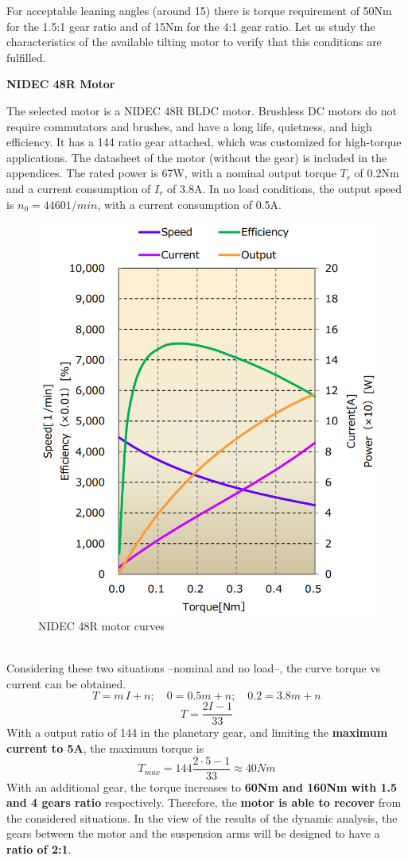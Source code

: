 For acceptable leaning angles (around 15\degree) there is torque requirement of 50Nm for the 1.5:1 gear ratio and of 15Nm for the 4:1 gear ratio. Let us study the characteristics of the available tilting motor to verify that this conditions are fulfilled.   

\newpage
\textbf{NIDEC 48R Motor}

The selected motor is a NIDEC 48R BLDC motor. Brushless DC motors do not require commutators and brushes, and have a long life, quietness, and high efficiency. It has a 144 ratio gear attached, which was customized for high-torque applications. The datasheet of the motor (without the gear) is included in the appendices. The rated power is 67W, with a nominal output torque $T_{r}$ of 0.2Nm and a current consumption of $I_{r}$ of 3.8A. In no load conditions, the output speed is $n_{0}=4460 1/min$, with a current consumption of 0.5A.
\begin{figure}[h!]
	\includegraphics[width=0.85\linewidth]{figs/05/sim/motor}
	\caption{NIDEC 48R motor curves}
\end{figure}
\\\6
Considering these two situations --nominal and no load--, the curve torque vs current can be obtained. \[T=m\,I+n; \quad 0=0.5m + n; \quad 0.2=3.8m+n\] \[T=\frac{2I-1}{33}\] With a output ratio of 144 in the planetary gear, and limiting the \textbf{maximum current to 5A}, the maximum torque is \[T_{max}=144\frac{2·5-1}{33}\approx 40 Nm\] With an additional gear, the torque increases to \textbf{60Nm and 160Nm with 1.5 and 4 gears ratio} respectively. Therefore, the \textbf{motor is able to recover} from the considered situations. In the view of the results of the dynamic analysis, the gears between the motor and the suspension arms will be designed to have a \textbf{ratio of 2:1}.

